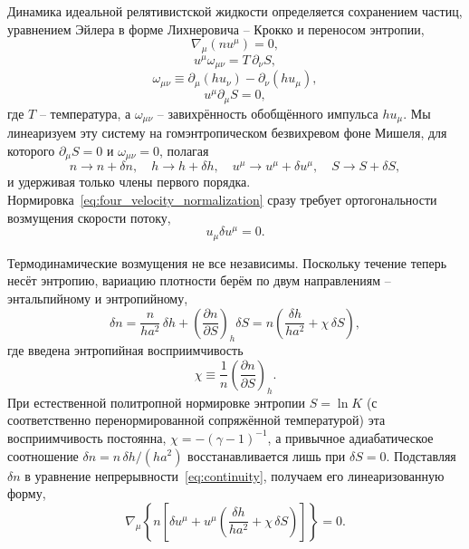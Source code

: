 \documentclass[12pt,a4paper,preprint,nopreprintline]{elsarticle}
\begin{document}
Динамика идеальной релятивистской жидкости определяется сохранением частиц, уравнением Эйлера в форме Лихнеровича -- Крокко и переносом энтропии,
\begin{equation}
    \nabla_{\mu}(nu^{\mu})=0,
    \label{eq:continuity}
\end{equation}
\begin{equation}
    u^{\mu}\omega_{\mu\nu}=T\,\partial_{\nu}S,
    \label{eq:euler_crocco}
\end{equation}
\begin{equation}
    \omega_{\mu\nu}
    \equiv
    \partial_{\mu}(hu_{\nu})-\partial_{\nu}(hu_{\mu}),
    \label{eq:vorticity_definition}
\end{equation}
\begin{equation}
    u^{\mu}\partial_{\mu}S=0,
    \label{eq:entropy_advection}
\end{equation}
где $T$ -- температура, а $\omega_{\mu\nu}$ -- завихрённость обобщённого импульса $hu_{\mu}$. Мы линеаризуем эту систему на гомэнтропическом безвихревом фоне Мишеля, для которого $\partial_{\mu}S=0$ и $\omega_{\mu\nu}=0$, полагая
\begin{equation}
    n\rightarrow n+\delta n,\quad
    h\rightarrow h+\delta h,\quad
    u^{\mu}\rightarrow u^{\mu}+\delta u^{\mu},\quad
    S\rightarrow S+\delta S,
    \label{eq:perturbation_expansion}
\end{equation}
и удерживая только члены первого порядка. Нормировка~\eqref{eq:four_velocity_normalization} сразу требует ортогональности возмущения скорости потоку,
\begin{equation}
    u_{\mu}\delta u^{\mu}=0.
    \label{eq:velocity_orthogonality}
\end{equation}

Термодинамические возмущения не все независимы. Поскольку течение теперь несёт энтропию, вариацию плотности берём по двум направлениям -- энтальпийному и энтропийному,
\begin{equation}
    \delta n
    =
    \frac{n}{ha^{2}}\,\delta h
    +\left(\frac{\partial n}{\partial S}\right)_{h}\delta S
    =
    n\left(\frac{\delta h}{ha^{2}}+\chi\,\delta S\right),
    \label{eq:thermodynamic_perturbation}
\end{equation}
где введена энтропийная восприимчивость
\begin{equation}
    \chi
    \equiv
    \frac{1}{n}\left(\frac{\partial n}{\partial S}\right)_{h}.
    \label{eq:chi_definition}
\end{equation}
При естественной политропной нормировке энтропии $S=\ln K$ (с соответственно перенормированной сопряжённой температурой) эта восприимчивость постоянна, $\chi=-(\gamma-1)^{-1}$, а привычное адиабатическое соотношение $\delta n=n\,\delta h/(ha^{2})$ восстанавливается лишь при $\delta S=0$. Подставляя $\delta n$ в уравнение непрерывности~\eqref{eq:continuity}, получаем его линеаризованную форму,
\begin{equation}
    \nabla_{\mu}
    \left\{
        n\left[
            \delta u^{\mu}
            +u^{\mu}\left(
                \frac{\delta h}{ha^{2}}+\chi\,\delta S
            \right)
        \right]
    \right\}
    =0.
    \label{eq:linearized_continuity}
\end{equation}
\end{document}
